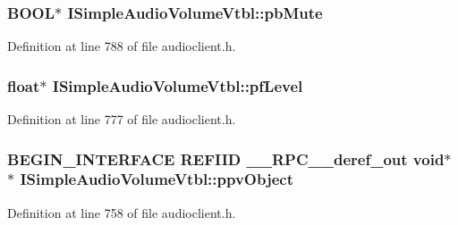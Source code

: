 \subsubsection[{\texorpdfstring{pb\+Mute}{pbMute}}]{ {\bf B\+O\+OL}$\ast$ I\+Simple\+Audio\+Volume\+Vtbl\+::pb\+Mute}\hypertarget{struct_i_simple_audio_volume_vtbl_ad5daabadd9726de484b3ea6e7ec07e91}{}\label{struct_i_simple_audio_volume_vtbl_ad5daabadd9726de484b3ea6e7ec07e91}


Definition at line 788 of file audioclient.\+h.

\subsubsection[{\texorpdfstring{pf\+Level}{pfLevel}}]{ float$\ast$ I\+Simple\+Audio\+Volume\+Vtbl\+::pf\+Level}\hypertarget{struct_i_simple_audio_volume_vtbl_adac9e6ab94d274122b56d561abde6b35}{}\label{struct_i_simple_audio_volume_vtbl_adac9e6ab94d274122b56d561abde6b35}


Definition at line 777 of file audioclient.\+h.

\subsubsection[{\texorpdfstring{ppv\+Object}{ppvObject}}]{\setlength{\rightskip}{0pt plus 5cm}B\+E\+G\+I\+N\+\_\+\+I\+N\+T\+E\+R\+F\+A\+CE {\bf R\+E\+F\+I\+ID} {\bf \+\_\+\+\_\+\+R\+P\+C\+\_\+\+\_\+deref\+\_\+out} {\bf void}$\ast$$\ast$ I\+Simple\+Audio\+Volume\+Vtbl\+::ppv\+Object}\hypertarget{struct_i_simple_audio_volume_vtbl_a13d23c293f79d9717749349baeaf5dce}{}\label{struct_i_simple_audio_volume_vtbl_a13d23c293f79d9717749349baeaf5dce}


Definition at line 758 of file audioclient.\+h.

